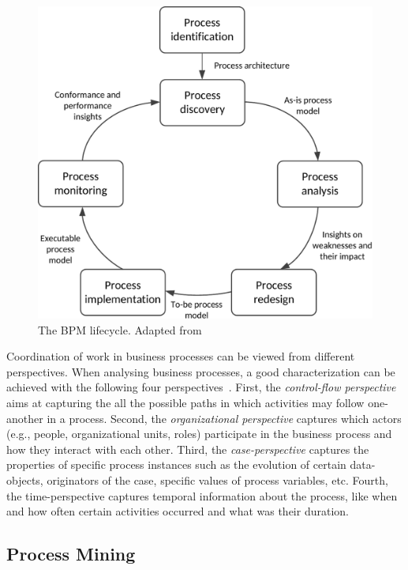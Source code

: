 \begin{figure}
	\centering
	\includegraphics[width=0.8\linewidth]{figures/bpm-lifecycle}
	\caption[The BPM lifecycle]{The BPM lifecycle. Adapted from \cite[]{Dumas2018}}
	\label{fig:bpm-lifecycle}
\end{figure}

Coordination of work in business processes can be viewed from different perspectives. When analysing business processes, a good characterization can be achieved with the following four perspectives~\citep{DBLP:books/sp/Aalst16}. 
First, the \emph{control-flow perspective} aims at capturing the all the possible paths in which activities may follow one-another in a process. Second, the \emph{organizational perspective} captures which actors (e.g., people, organizational units, roles) participate in the business process and how they interact with each other. Third, the \emph{case-perspective} captures the properties of specific process instances such as the evolution of certain data-objects, originators of the case, specific values of process variables, etc. Fourth, the time-perspective captures temporal information about the process, like when and how often certain activities occurred and what was their duration.


\subsection{Process Mining}
\label{sec:process-mining}


